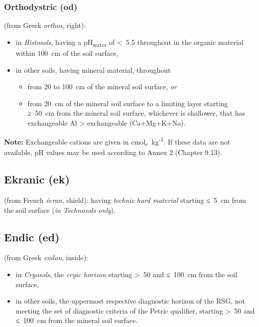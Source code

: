 \documentclass[
  letterpaper,
  DIV=11,
  numbers=noendperiod]{scrreprt}
\providecommand{\tightlist}{%
  \setlength{\itemsep}{0pt}\setlength{\parskip}{0pt}}\usepackage{longtable,booktabs,array}
\begin{document}
\hypertarget{orthodystric-od}{%
\subsubsection{Orthodystric (od)}\label{orthodystric-od}}

(from Greek \emph{orthos}, right):

\begin{itemize}
\tightlist
\item
  in \emph{Histosols}, having a pH\textsubscript{water} of \textless~5.5
  throughout in the organic material within 100~cm of the soil surface,
\item
  in other soils, having mineral material, throughout

  \begin{itemize}
  \tightlist
  \item
    from 20 to 100~cm of the mineral soil surface, \emph{or}
  \item
    from 20~cm of the mineral soil surface to a limiting layer starting
    ≥~50~cm from the mineral soil surface, whichever is shallower, that
    has exchangeable Al \textgreater{} exchangeable (Ca+Mg+K+Na).
  \end{itemize}
\end{itemize}

\textbf{Note:} Exchangeable cations are given in
cmol\textsubscript{c}~kg\textsuperscript{-1}. If these data are not
available, pH values may be used according to Annex 2 (Chapter 9.13).

\hypertarget{ekranic-ek}{%
\subsection{Ekranic (ek)}\label{ekranic-ek}}

(from French \emph{écran}, shield): having \emph{technic hard material}
starting ≤~5~cm from the soil surface (\emph{in Technosols only}).

\hypertarget{endic-ed}{%
\subsection{Endic (ed)}\label{endic-ed}}

(from Greek \emph{endon}, inside):

\begin{itemize}
\item
  in \emph{Cryosols}, the \emph{cryic horizon} starting \textgreater~50
  and ≤~100~cm from the soil surface,
\item
  in other soils, the uppermost respective diagnostic horizon of the
  RSG, not meeting the set of diagnostic criteria of the Petric
  qualifier, starting \textgreater~50 and ≤~100~cm from the mineral soil
  surface.
\end{itemize}
\end{document}
